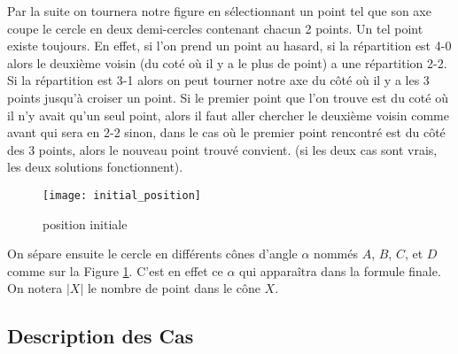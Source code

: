 Par la suite on tournera notre figure en sélectionnant un point tel que son axe coupe le cercle en deux demi-cercles contenant chacun 2 points. Un tel point existe toujours. En effet, si l'on prend un point au hasard, si la répartition est 4-0  alors le deuxième voisin (du coté où il y a le plus de point) a une répartition 2-2. Si la répartition est 3-1 alors on peut tourner notre axe du côté où il y a les 3 points jusqu'à croiser un point. Si le premier point que l'on trouve est du coté où il n'y avait qu'un seul point, alors il faut aller chercher le deuxième voisin comme avant qui sera en 2-2 sinon, dans le cas où le premier point rencontré est du côté des 3 points, alors le nouveau point trouvé convient. (si les deux cas sont vrais, les deux solutions fonctionnent).

\begin{figure}[h!]
 \centering
  \texttt{[image: initial\_position]}
 \caption{position initiale}
 \label{fig:initial_position}
\end{figure}

  On sépare ensuite le cercle en différents cônes d'angle $\alpha$ nommés $A$,
  $B$, $C$, et $D$ comme sur la Figure \ref{fig:initial_position}. C'est en
  effet ce $\alpha$ qui apparaîtra dans la formule finale. On notera $|X|$ le
  nombre de point dans le cône $X$.

\subsection*{Description des Cas}

